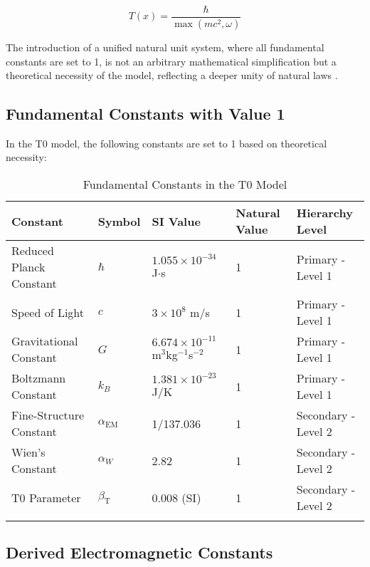 \documentclass[12pt,a4paper]{article}
\newcommand{\Tfield}{T(x)}
\newcommand{\alphaEM}{\alpha_{\text{EM}}}
\newcommand{\betaT}{\beta_{\text{T}}}
\begin{document}
	\begin{equation}
		\Tfield = \frac{\hbar}{\max(mc^2, \omega)}
	\end{equation}
	
	The introduction of a unified natural unit system, where all fundamental constants are set to 1, is not an arbitrary mathematical simplification but a theoretical necessity of the model, reflecting a deeper unity of natural laws \cite{pascher_alphabeta_2025}.
	
	\subsection{Fundamental Constants with Value 1}
	
	In the T0 model, the following constants are set to 1 based on theoretical necessity:
	
	\begin{table}[h]
		\centering
		\begin{adjustbox}{scale=0.75}
			\begin{tabular}{lllll}
				\hline
				\textbf{Constant} & \textbf{Symbol} & \textbf{SI Value} & \textbf{Natural Value} & \textbf{Hierarchy Level} \\
				\hline
				Reduced Planck Constant & $\hbar$ & $1.055 \times 10^{-34}$ J$\cdot$s & 1 & Primary - Level 1 \\
				Speed of Light & $c$ & $3 \times 10^8$ m/s & 1 & Primary - Level 1 \\
				Gravitational Constant & $G$ & $6.674 \times 10^{-11}$ m$^3$kg$^{-1}$s$^{-2}$ & 1 & Primary - Level 1 \\
				Boltzmann Constant & $k_B$ & $1.381 \times 10^{-23}$ J/K & 1 & Primary - Level 1 \\
				Fine-Structure Constant & $\alphaEM$ & 1/137.036 & 1 & Secondary - Level 2 \\
				Wien’s Constant & $\alpha_W$ & 2.82 & 1 & Secondary - Level 2 \\
				T0 Parameter & $\betaT$ & 0.008 (SI) & 1 & Secondary - Level 2 \\
				\hline
				\multicolumn{4}{c}{} \\
				\hline
			\end{tabular}
		\end{adjustbox}
		\caption{Fundamental Constants in the T0 Model}
		\label{tab:fund_const}
	\end{table}
	
	\subsection{Derived Electromagnetic Constants}
	
\end{document}
